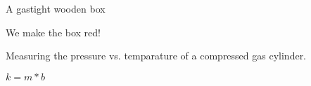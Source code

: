 \documentclass[twoside]{article}
\begin{document}
\begin{module}[id=thermostatics]
\begin{system}[id=gas-cylinder]
  \begin{realization}
    A gastight wooden box
  \end{realization}
  \begin{preparation}We make the box red!\end{preparation}
  \begin{state}
  \end{state}
\end{system}
\begin{experiment}[id=ex-pressure-vs-temp]
  Measuring the pressure vs. temparature of a compressed gas cylinder.
  \begin{measurement}[id=m-213]
    \begin{state}[of=gas-cylinder]
    \end{state}
    \begin{state}[of=mercury-theormometer]
    \end{state}
  \end{measurement}
\end{experiment}

\begin{assertion}[id=kraftgleichung,type=natural-law]
  $k=m*b$
\end{assertion}
\end{module}
\end{document}
